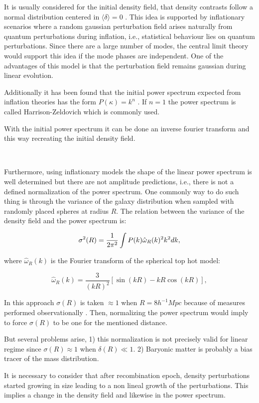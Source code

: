 It is usually considered for the initial density field, that density contrasts 
follow a normal distribution centered in $\langle \delta \rangle = 0$ \cite{Bernardeau}. This idea is supported by
inflationary scenarios where a random gaussian perturbation field arises naturally from quantum 
perturbations during inflation, i.e., statistical behaviour lies on quantum perturbations. 
Since there are a large number of modes, the central limit theory 
would support this idea if the mode phases are independent. 
One of the advantages of this model is that the perturbation field remains gaussian during linear evolution. 

Additionally it has been found that the initial power spectrum expected from inflation theories 
has the form $P(\kappa)= k^n$ \cite{Bernardeau}. If $n=1$ the power spectrum is called Harrison-Zeldovich which is 
commonly used. 

With the initial power spectrum it can be done an inverse fourier transform and this way recreating the initial density field. 

\

Furthermore, using inflationary models the shape of the linear power spectrum is well 
determined but there are not amplitude predictions, i.e., there is not a defined 
normalization of the power spectrum. 
One commonly way to do such thing is through the variance of the galaxy distribution when
sampled with randomly placed spheres at radius $R$. The relation between the variance of the 
density field and the power spectrum is:

\[
\sigma^2(R) = \frac{1}{2\pi^2} \int P(k)\hat{\omega}_R(k)^2k^2 dk ,
\]

where $\hat{\omega}_R(k)$ is the Fourier transform of the spherical top hot model:

\[\hat{\omega}_R(k) = \frac{3}{(k R)^2}[\sin(kR)-kR\cos(k R)],\]
 
In this approach $\sigma(R)$ is taken $\approx 1$ when $R=8h^{-1}Mpc$ because of 
measures performed observationally \cite{bosch}. 
Then, normalizing the power spectrum would imply to force $\sigma(R)$ to be one 
for the mentioned distance.

But several problems arise, 1) this normalization is not precisely valid
for linear regime since $\sigma(R)\approx 1$ when $\delta(R)\ll 1$. 2) Baryonic matter is probably a bias tracer of the mass distribution. 


It is necessary to consider that after recombination epoch, density perturbations started
growing in size leading to a non lineal growth of the perturbations. This implies a change in the 
density field and likewise in the power spectrum. 



